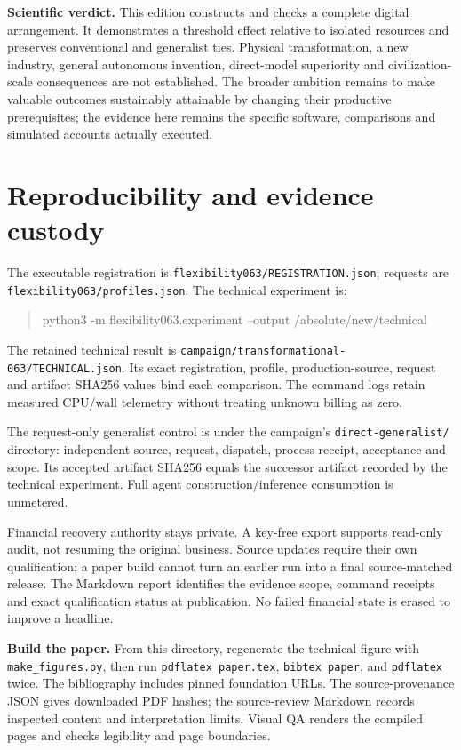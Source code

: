 \documentclass[10pt,a4paper]{article}
\newcommand{\code}[1]{\texttt{\small #1}}
\begin{document}
\textbf{Scientific verdict.} This edition constructs and checks a complete digital arrangement. It demonstrates a threshold effect relative to isolated resources and preserves conventional and generalist ties. \FinalVerdict{} Physical transformation, a new industry, general autonomous invention, direct-model superiority and civilization-scale consequences are not established. The broader ambition remains to make valuable outcomes sustainably attainable by changing their productive prerequisites; the evidence here remains the specific software, comparisons and simulated accounts actually executed.
\newpage

\section{Reproducibility and evidence custody}
The executable registration is \code{flexibility063/REGISTRATION.json}; requests are \code{flexibility063/profiles.json}. The technical experiment is:
\begin{quote}\small\ttfamily
python3 -m flexibility063.experiment --output /absolute/new/technical
\end{quote}
The retained technical result is \code{campaign/transformational-063/TECHNICAL.json}. Its exact registration, profile, production-source, request and artifact SHA256 values bind each comparison. The command logs retain measured CPU/wall telemetry without treating unknown billing as zero.

The request-only generalist control is under the campaign's \code{direct-generalist/} directory: independent source, request, dispatch, process receipt, acceptance and scope. Its accepted artifact SHA256 equals the successor artifact recorded by the technical experiment. Full agent construction/inference consumption is unmetered.

\NativeReproduction{}

Financial recovery authority stays private. A key-free export supports read-only audit, not resuming the original business. Source updates require their own qualification; a paper build cannot turn an earlier run into a final source-matched release. The Markdown report identifies the evidence scope, command receipts and exact qualification status at publication. No failed financial state is erased to improve a headline.

\textbf{Build the paper.} From this directory, regenerate the technical figure with \code{make\_figures.py}, then run \code{pdflatex paper.tex}, \code{bibtex paper}, and \code{pdflatex} twice. The bibliography includes pinned foundation URLs. The source-provenance JSON gives downloaded PDF hashes; the source-review Markdown records inspected content and interpretation limits. Visual QA renders the compiled pages and checks legibility and page boundaries.

\begingroup
\footnotesize
\setlength{\bibsep}{3pt}


\endgroup
\end{document}
